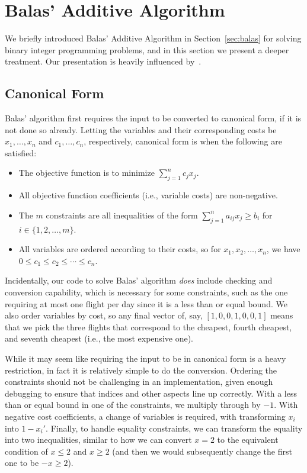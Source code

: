 \documentclass{article}
\begin{document}
\newpage
\section{Balas' Additive Algorithm}\label{app:balas}

We briefly introduced Balas' Additive Algorithm in Section~\ref{sec:balas} for solving binary integer programming problems, and in this section we
present a deeper treatment. Our presentation is heavily influenced by~\cite{carleton}.

\subsection{Canonical Form}

Balas' algorithm first requires the input to be converted to canonical form, if it is not done so already. Letting the variables and their
corresponding costs be $x_1, \ldots, x_n$ and $c_1, \ldots, c_n$, respectively, canonical form is when the following are satisfied:

\begin{itemize}[noitemsep]
    \item The objective function is to minimize $\sum_{j=1}^n c_jx_j$.
    \item All objective function coefficients (i.e., variable costs) are non-negative. 
    \item The $m$ constraints are all inequalities of the form $\sum_{j=1}^{n} a_{ij}x_j \ge b_i$ for $i \in \{1,2,\ldots,m\}$.
    \item All variables are ordered according to their costs, so for $x_1, x_2, \ldots, x_n$, we have $0 \le c_1 \le c_2 \le \cdots \le c_n$. 
\end{itemize}

Incidentally, our code to solve Balas' algorithm \emph{does} include checking and conversion capability, which is necessary for some constraints, such
as the one requiring at most one flight per day since it is a less than or equal bound. We also order variables by cost, so any final vector of, say,
$[1,0,0,1,0,0,1]$ means that we pick the three flights that correspond to the cheapest, fourth cheapest, and seventh cheapest (i.e., the most
expensive one).

While it may seem like requiring the input to be in canonical form is a heavy restriction, in fact it is relatively simple to do the conversion.
Ordering the constraints should not be challenging in an implementation, given enough debugging to ensure that indices and other aspects line up
correctly. With a less than or equal bound in one of the constraints, we multiply through by $-1$. With negative cost coefficients, a change of
variables is required, with transforming $x_i$ into $1-x_i'$. Finally, to handle equality constraints, we can transform the equality into two
inequalities, similar to how we can convert $x=2$ to the equivalent condition of $x\le2$ and $x\ge2$ (and then we would subsequently change the first
one to be $-x\ge2$).
\end{document}
